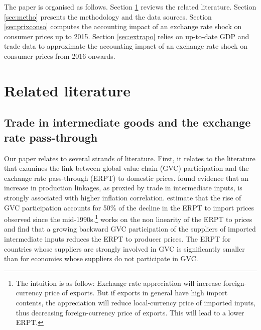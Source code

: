 \documentclass[11pt,a4paper]{article}
\begin{document}

The paper is organised as follows.
Section \ref{sec:lit} reviews the related literature.
Section \ref{sec:metho} presents the methodology and the data sources.
Section \ref{sec:prixconso} computes the accounting impact of an exchange rate shock on consumer prices up to 2015. 
Section \ref{sec:extrapo} relies on up-to-date GDP and trade data to approximate the accounting impact of an exchange rate shock on consumer prices from 2016 onwards.


\label{sec:intro}


\section{Related literature}
\label{sec:lit}

\subsection{Trade in intermediate goods and the exchange rate pass-through} 

Our paper relates to several strands of literature.
First, it relates to the literature that examines the link between global value chain (GVC) participation and the exchange rate pass-through (ERPT) to domestic prices. \cite{DeSoyres2018} found evidence that an increase in production linkages, as proxied by trade in intermediate inputs, is strongly associated with higher inflation correlation. 
\cite{Georgiadis2019} estimate that the rise of GVC participation accounts for 50\% of the decline in the ERPT to import prices observed since the mid-1990s.\footnote{The intuition is as follow: Exchange rate appreciation will increase foreign-currency price of exports. But if exports in general have high import contents, the appreciation will reduce local-currency price of imported inputs, thus decreasing foreign-currency price of exports. This will lead to a lower ERPT. }
\cite{Hagemejer2020} works on the non linearity of the ERPT to prices and find that a growing backward GVC participation of the suppliers of imported intermediate inputs reduces the ERPT to producer prices. The ERPT for countries whose suppliers are strongly involved in GVC is significantly smaller than for economies whose suppliers do not participate in GVC. 
\end{document}
